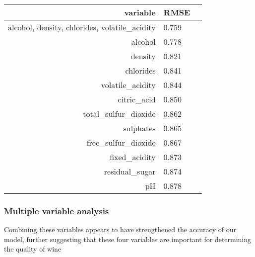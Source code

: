 \documentclass[11pt]{article}
\begin{document}
    \begin{tabular}{r|ll}
 variable & RMSE\\
\hline
	 alcohol, density, chlorides, volatile\_acidity & 0.759                                          \\
	 alcohol                                       & 0.778                                        \\
	 density                                       & 0.821                                        \\
	 chlorides                                     & 0.841                                        \\
	 volatile\_acidity                              & 0.844                                          \\
	 citric\_acid                                   & 0.850                                          \\
	 total\_sulfur\_dioxide                          & 0.862                                            \\
	 sulphates                                     & 0.865                                        \\
	 free\_sulfur\_dioxide                           & 0.867                                            \\
	 fixed\_acidity                                 & 0.873                                          \\
	 residual\_sugar                                & 0.874                                          \\
	 pH                                            & 0.878                                        \\
\end{tabular}


    
    \hypertarget{multiple-variable-analysis}{%
\subsubsection{Multiple variable
analysis}\label{multiple-variable-analysis}}

Combining these variables appears to have strengthened the accuracy of
our model, further suggesting that these four variables are important
for determining the quality of wine
\end{document}
